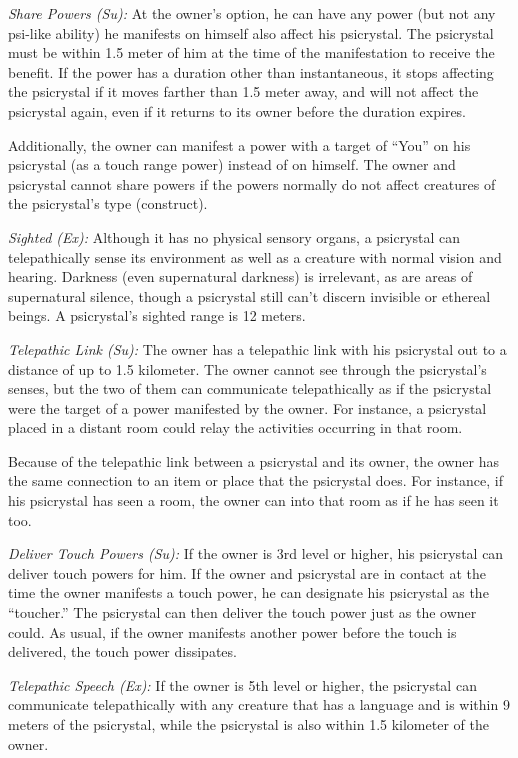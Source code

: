 {\textit{Share Powers (Su):} At the owner's option, he can have any power (but not any psi-like ability) he manifests on himself also affect his psicrystal. The psicrystal must be within 1.5 meter of him at the time of the manifestation to receive the benefit. If the power has a duration other than instantaneous, it stops affecting the psicrystal if it moves farther than 1.5 meter away, and will not affect the psicrystal again, even if it returns to its owner before the duration expires.

Additionally, the owner can manifest a power with a target of ``You'' on his psicrystal (as a touch range power) instead of on himself. The owner and psicrystal cannot share powers if the powers normally do not affect creatures of the psicrystal's type (construct).

\textit{Sighted (Ex):} Although it has no physical sensory organs, a psicrystal can telepathically sense its environment as well as a creature with normal vision and hearing. Darkness (even supernatural darkness) is irrelevant, as are areas of supernatural silence, though a psicrystal still can't discern invisible or ethereal beings. A psicrystal's sighted range is 12 meters.

\textit{Telepathic Link (Su):} The owner has a telepathic link with his psicrystal out to a distance of up to 1.5 kilometer. The owner cannot see through the psicrystal's senses, but the two of them can communicate telepathically as if the psicrystal were the target of a  power manifested by the owner. For instance, a psicrystal placed in a distant room could relay the activities occurring in that room.

Because of the telepathic link between a psicrystal and its owner, the owner has the same connection to an item or place that the psicrystal does. For instance, if his psicrystal has seen a room, the owner can  into that room as if he has seen it too.

\textit{Deliver Touch Powers (Su):} If the owner is 3rd level or higher, his psicrystal can deliver touch powers for him. If the owner and psicrystal are in contact at the time the owner manifests a touch power, he can designate his psicrystal as the ``toucher.'' The psicrystal can then deliver the touch power just as the owner could. As usual, if the owner manifests another power before the touch is delivered, the touch power dissipates.

\textit{Telepathic Speech (Ex):} If the owner is 5th level or higher, the psicrystal can communicate telepathically with any creature that has a language and is within 9 meters of the psicrystal, while the psicrystal is also within 1.5 kilometer of the owner.

}
